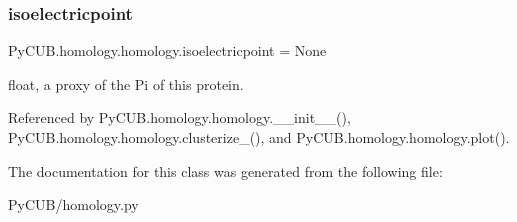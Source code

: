 \subsubsection{\texorpdfstring{isoelectricpoint}{isoelectricpoint}}
{\footnotesize\ttfamily Py\+C\+U\+B.\+homology.\+homology.\+isoelectricpoint = None\hspace{0.3cm}{\ttfamily [static]}}



float, a proxy of the Pi of this protein. 



Referenced by Py\+C\+U\+B.\+homology.\+homology.\+\_\+\+\_\+init\+\_\+\+\_\+(), Py\+C\+U\+B.\+homology.\+homology.\+clusterize\+\_\+(), and Py\+C\+U\+B.\+homology.\+homology.\+plot().



The documentation for this class was generated from the following file\+:\begin{DoxyCompactItemize}
\item 
Py\+C\+U\+B/homology.\+py\end{DoxyCompactItemize}
